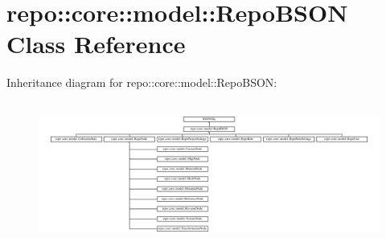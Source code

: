 \hypertarget{classrepo_1_1core_1_1model_1_1_repo_b_s_o_n}{}\section{repo\+:\+:core\+:\+:model\+:\+:Repo\+B\+S\+O\+N Class Reference}
\label{classrepo_1_1core_1_1model_1_1_repo_b_s_o_n}
Inheritance diagram for repo\+:\+:core\+:\+:model\+:\+:Repo\+B\+S\+O\+N\+:\begin{figure}[H]
\begin{center}
\leavevmode
\includegraphics[height=4.725739cm]{classrepo_1_1core_1_1model_1_1_repo_b_s_o_n}
\end{center}
\end{figure}
